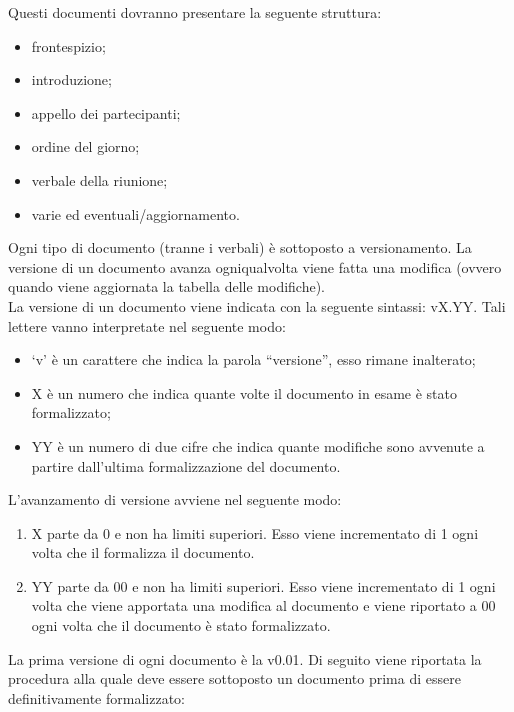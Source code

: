 						Questi documenti dovranno presentare la seguente struttura:
						\begin{itemize}
							\item frontespizio;
							\item introduzione;
							\item appello dei partecipanti;
							\item ordine del giorno;
							\item verbale della riunione;
							\item varie ed eventuali/aggiornamento.
						\end{itemize}
			 \label{sec:versioni}
				Ogni tipo di documento (tranne i verbali) è sottoposto a versionamento. La versione di un documento avanza ogniqualvolta viene fatta una modifica (ovvero quando viene aggiornata la tabella delle modifiche).\\
				La versione di un documento viene indicata con la seguente sintassi: vX.YY. Tali lettere vanno interpretate nel seguente modo:
				\begin{itemize}
					\item ‘v’ è un carattere che indica la parola “versione”, esso rimane inalterato;
					\item X è un numero che indica quante volte il documento in esame è stato formalizzato;
					\item YY è un numero di due cifre che indica quante modifiche sono avvenute a partire dall’ultima formalizzazione del documento.
				\end{itemize}
				L’avanzamento di versione avviene nel seguente modo:
				\begin{enumerate}
					\item X parte da 0 e non ha limiti superiori. Esso viene incrementato di 1 ogni volta che il  formalizza il documento.
					\item YY parte da 00 e non ha limiti superiori. Esso viene incrementato di 1 ogni volta che viene apportata una modifica al documento e viene riportato a 00 ogni volta che il documento è stato formalizzato.
				\end{enumerate}
				La prima versione di ogni documento è la v0.01.
				Di seguito viene riportata la procedura alla quale deve essere sottoposto un documento prima di essere definitivamente formalizzato:
